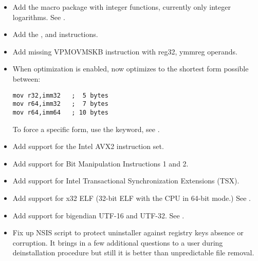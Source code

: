 
\begin{itemize}
    \item{Add the  macro package with integer functions, currently
        only integer logarithms. See .}
    \item{Add the ,  and  instructions.}
\end{itemize}


\begin{itemize}
    \item{Add missing VPMOVMSKB instruction with reg32, ymmreg operands.}
\end{itemize}


\begin{itemize}
    \item{When optimization is enabled,  now optimizes to the
        shortest form possible between:
\begin{lstlisting}
mov r32,imm32   ;  5 bytes
mov r64,imm32   ;  7 bytes
mov r64,imm64   ; 10 bytes
\end{lstlisting}
        To force a specific form, use the  keyword, see .}
    \item{Add support for the Intel AVX2 instruction set.}
    \item{Add support for Bit Manipulation Instructions 1 and 2.}
    \item{Add support for Intel Transactional Synchronization Extensions (TSX).}
    \item{Add support for x32 ELF (32-bit ELF with the CPU in 64-bit mode.) See .}
    \item{Add support for bigendian UTF-16 and UTF-32. See .}
\end{itemize}


\begin{itemize}
    \item{Fix up NSIS script to protect uninstaller against registry keys
        absence or corruption. It brings in a few additional questions
        to a user during deinstallation procedure but still it is better
        than unpredictable file removal.}
\end{itemize}

